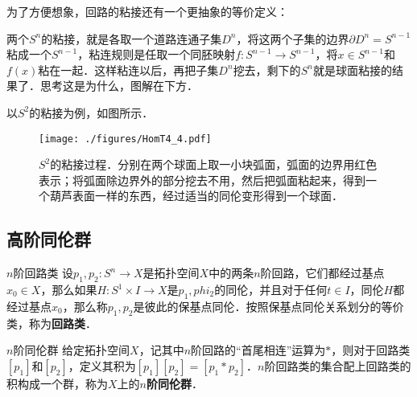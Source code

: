 为了方便想象，回路的粘接还有一个更抽象的等价定义：

\begin{exercise}{}
两个$S^n$的粘接，就是各取一个道路连通子集$D^n$，将这两个子集的边界$\partial D^n=S^{n-1}$粘成一个$S^{n-1}$，粘连规则是任取一个同胚映射$f:S^{n-1}\rightarrow S^{n-1}$，将$x\in S^{n-1}$和$f(x)$粘在一起．这样粘连以后，再把子集$D^n$挖去，剩下的$S^n$就是球面粘接的结果了．思考这是为什么，图解在下方．
\end{exercise}

以$S^2$的粘接为例，如图所示．

\begin{figure}[ht]
\centering
\texttt{[image: ./figures/HomT4\_4.pdf]}
\caption{$S^2$的粘接过程．分别在两个球面上取一小块弧面，弧面的边界用红色表示；将弧面除边界外的部分挖去不用，然后把弧面粘起来，得到一个葫芦表面一样的东西，经过适当的同伦变形得到一个球面．} \label{HomT4_fig4}
\end{figure}

\subsection{高阶同伦群}

\begin{definition}{$n$阶回路类}
设$p_1, p_2:S^n\rightarrow X$是拓扑空间$X$中的两条$n$阶回路，它们都经过基点$x_0\in X$，那么如果$H:S^1\times I\rightarrow X$是$p_1, phi_2$的同伦，并且对于任何$t\in I$，同伦$H$都经过基点$x_0$，那么称$p_1, p_2$是彼此的保基点同伦．按照保基点同伦关系划分的等价类，称为\textbf{回路类}．
\end{definition}

\begin{definition}{$n$阶同伦群}
给定拓扑空间$X$，记其中$n$阶回路的“首尾相连”运算为$*$，则对于回路类$[p_1]$和$[p_2]$，定义其积为$[p_1][p_2]=[p_1*p_2]$．$n$阶回路类的集合配上回路类的积构成一个群，称为$X$上的$n$\textbf{阶同伦群}．
\end{definition}

